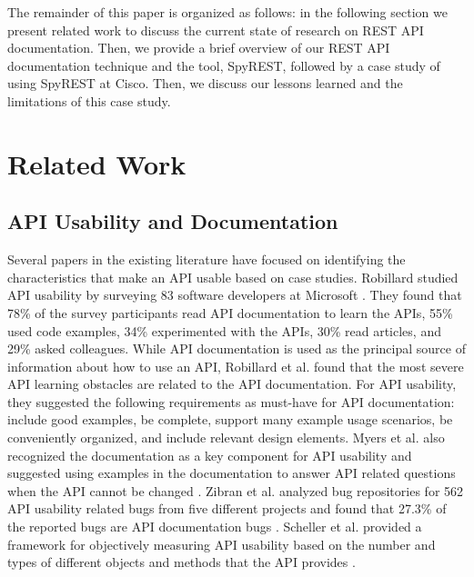 \documentclass[10pt, conference]{IEEEtran}
\begin{document}
The remainder of this paper is organized as follows: in the following section we present  related work to discuss the current state of research on REST API documentation. Then, we provide a brief overview of our REST API documentation technique and the tool, SpyREST, followed by a case study of using SpyREST at Cisco. Then, we discuss our lessons learned and the limitations of this case study.


\section{Related Work}

\subsection{API Usability and Documentation} %

Several papers in the existing literature have focused on identifying the characteristics that make an API usable based on case studies. Robillard studied API usability by surveying 83 software developers at Microsoft \cite{Robillard_a_field_study}. They found that 78\% of the survey participants read API documentation to learn the APIs, 55\% used code examples, 34\% experimented with the APIs, 30\% read articles, and 29\% asked colleagues. While API documentation is used as the principal source of information about how to use an API, Robillard et al. found that the most severe API learning obstacles are related to the API documentation. For API usability, they suggested the following requirements as must-have for API documentation: include good examples, be complete, support many example usage scenarios, be conveniently organized, and include relevant design elements. Myers et al. also recognized the documentation as a key component for API usability and suggested using examples in the documentation to answer API related questions when the API cannot be changed \cite{Myers_improving_api}. Zibran et al. analyzed bug repositories for 562 API usability related bugs from five different projects and found that 27.3\% of the reported bugs are API documentation bugs \cite{zibran2011useful}. Scheller et al. provided a framework for objectively measuring API usability based on the number and types of different objects and methods that the API provides \cite{scheller2015automated}.
\end{document}
